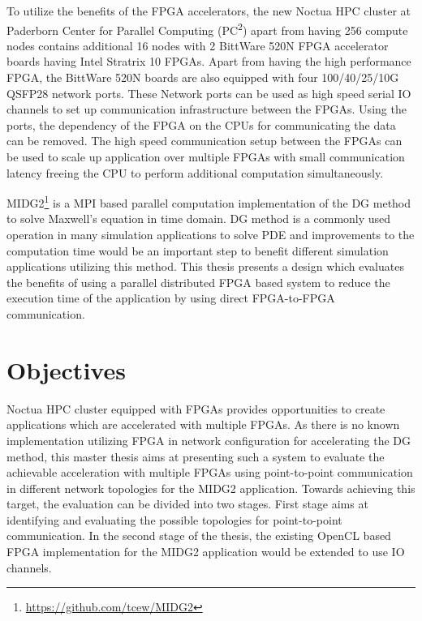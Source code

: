 To utilize the benefits of the FPGA accelerators, the new Noctua \ac{HPC} cluster at Paderborn Center for
Parallel Computing (PC\textsuperscript{2}) apart from having 256 compute nodes contains additional 16 nodes with 2 BittWare 520N
FPGA accelerator boards having Intel Stratrix 10 FPGAs. Apart from having the high performance FPGA, the BittWare 520N boards
are also equipped with four 100/40/25/10G QSFP28 network ports. These Network ports can be used as
high speed serial IO channels to set up communication infrastructure between the FPGAs.
Using the ports, the dependency of the FPGA on the CPUs for communicating
the data can be removed. The high speed communication setup between the FPGAs can be used to scale
up application over multiple FPGAs with small communication latency freeing the CPU
to perform additional computation simultaneously.

MIDG2\footnote{\url{https://github.com/tcew/MIDG2}} is a \ac{MPI} based parallel computation
implementation of the \ac{DG} \cite{hesthaven_nodal_2008} method to solve Maxwell’s equation
in time domain. \ac{DG} method is a commonly used operation in many simulation applications to
solve \ac{PDE} and improvements to the computation time would be an important step to
benefit different simulation applications utilizing this method. This thesis presents
a design which evaluates the benefits of using a parallel distributed FPGA based system
to reduce the execution time of the application by using direct FPGA-to-FPGA communication.

\section{Objectives}

Noctua \ac{HPC} cluster equipped with FPGAs provides opportunities to create applications
which are accelerated with multiple FPGAs. As there is
no known implementation utilizing FPGA in network configuration for accelerating the
DG method, this master thesis aims at presenting such a system to evaluate
the achievable acceleration with multiple FPGAs using point-to-point communication in
different network topologies for the MIDG2 application. Towards achieving this target,
the evaluation can be divided into two stages. First stage aims at identifying
and evaluating the possible topologies for point-to-point communication. In the second
stage of the thesis, the existing OpenCL based FPGA implementation for
the MIDG2 application would be extended to use IO channels.

